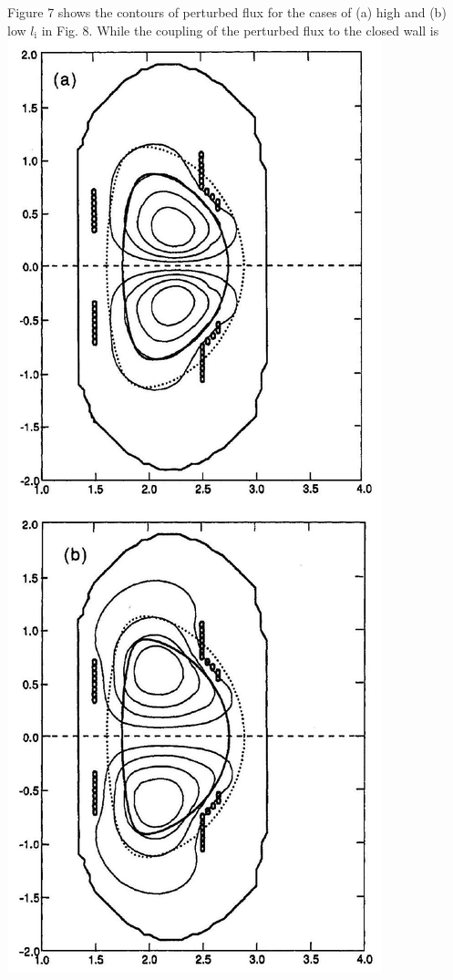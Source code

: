 \documentclass[10pt]{article}
\begin{document}
Figure 7 shows the contours of perturbed flux for the cases of (a) high and (b) low $l_{\mathrm{i}}$ in Fig. 8. While the coupling of the perturbed flux to the closed wall is\\
\includegraphics[max width=\textwidth, center]{2025_01_10_a0135324997886412d98g-8(1)}
\end{document}
